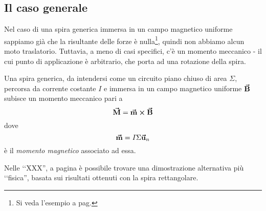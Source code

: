 \subsection{Il caso generale}
Nel caso di una spira generica immersa in un campo magnetico uniforme sappiamo già che la risultante delle forze è nulla\footnote{Si veda l'esempio a pag. \pageref{RisultateSpiraNulla}}, quindi non abbiamo alcun moto traslatorio. Tuttavia, a meno di casi specifici, c'è un momento meccanico - il cui punto di applicazione è arbitrario, che porta ad una rotazione della spira.
\begin{theorema}
	Una spira generica, da intendersi come un circuito piano chiuso di area $\Sigma$, percorsa da corrente costante $I$ e immersa in un campo magnetico uniforme $\vb*{\va{B}}$ subisce un momento meccanico pari a
	\begin{equation}
		\vb*{\va{M}}=\vb*{\va{m}}\cross\vb*{\va{B}}
	\end{equation}
	dove
	\begin{equation}
		\vb*{\va{m}}=I\Sigma\vb*{\va{u}}_n
	\end{equation}
	è il \textit{momento magnetico} associato ad essa.
\end{theorema}
\begin{observe}
	Nelle ‘‘XXX'', a pagina \pageref{XXX} è possibile trovare una dimostrazione alternativa più ‘‘fisica'', basata sui risultati ottenuti con la spira rettangolare.
\end{observe}
